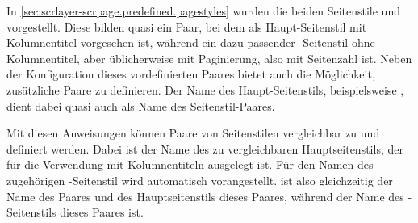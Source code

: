 In \autoref{sec:scrlayer-scrpage.predefined.pagestyles} wurden die beiden
Seitenstile  und 
vorgestellt. Diese bilden quasi ein Paar, bei dem  als
Haupt-Seitenstil mit Kolumnentitel vorgesehen ist, während
 ein dazu passender -Seitenstil
ohne Kolumnentitel, aber üblicherweise mit Paginierung, also mit Seitenzahl
ist. Neben der Konfiguration dieses vordefinierten Paares bietet
 auch die Möglichkeit, zusätzliche Paare zu
definieren. Der Name des Haupt-Seitenstils, beispielsweise
, dient dabei quasi auch als Name des Seitenstil-Paares.


\begin{Declaration}
\end{Declaration}
Mit diesen Anweisungen können Paare von Seitenstilen vergleichbar zu
 und  definiert
werden. Dabei ist  der Name des zu 
vergleichbaren Hauptseitenstils, der für die Verwendung mit Kolumnentiteln
ausgelegt ist. Für den Namen des zugehörigen -Seitenstil wird
 automatisch  vorangestellt.  ist also
gleichzeitig der Name des Paares und des Hauptseitenstils dieses Paares, während
 der Name des -Seitenstils dieses
Paares ist.

